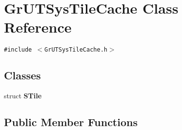 \hypertarget{class_gr_u_t_sys_tile_cache}{
\section{GrUTSysTileCache Class Reference}
\label{class_gr_u_t_sys_tile_cache}
}
{\tt \#include $<$GrUTSysTileCache.h$>$}

\subsection*{Classes}
\begin{CompactItemize}
\item 
struct \textbf{STile}
\end{CompactItemize}
\subsection*{Public Member Functions}
